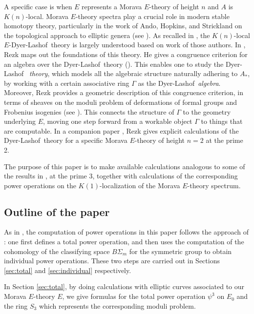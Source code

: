 \documentclass{gtpart}
\theoremstyle{definition}
\theoremstyle{remark}
\newcommand{\DL}{Dyer-Lashof~}
\newcommand{\G}{\Gamma}
\newcommand{\p}{\psi^3}
\begin{document}
A specific case is when $E$ represents a Morava $E$-theory of height $n$ 
and $A$ is $K(n)$-local.  Morava $E$-theory spectra play a crucial role 
in modern stable homotopy theory, particularly in the work of Ando, 
Hopkins, and Strickland on the topological approach to elliptic genera 
(see \cite{cube}).  As recalled in \cite[1.5]{cong}, the $K(n)$-local 
$E$-\DL theory is largely understood based on work of those authors.  In 
\cite{cong}, Rezk maps out the foundations of this theory.  He gives a 
congruence criterion for an algebra over the \DL theory 
(\cite[Theorem A]{cong}).  This enables one to study the \DL 
{\em theory}, which models all the algebraic structure naturally 
adhering to $A_*$, by working with a certain associative ring $\G$ as 
the \DL {\em algebra}.  Moreover, Rezk provides a geometric description 
of this congruence criterion, in terms of sheaves on the moduli problem 
of deformations of formal groups and Frobenius isogenies (see 
\cite[Theorem B]{cong}).  This connects the structure of $\G$ to the 
geometry underlying $E$, moving one step forward from a workable object 
$\G$ to things that are computable.  In a companion paper \cite{h2p2}, 
Rezk gives explicit calculations of the \DL theory for a specific Morava 
$E$-theory of height $n = 2$ at the prime 2.  

The purpose of this paper is to make available calculations analogous to 
some of the results in \cite{h2p2}, at the prime 3, together with 
calculations of the corresponding power operations on the 
$K(1)$-localization of the Morava $E$-theory spectrum.  


\subsection{Outline of the paper}

As in \cite{h2p2}, the computation of power operations in this paper 
follows the approach of \cite{steenrod}: one first defines a total power 
operation, and then uses the computation of the cohomology of the 
classifying space $B\Sigma_m$ for the symmetric group to obtain 
individual power operations.  These two steps are carried out in 
Sections \ref{sec:total} and \ref{sec:individual} respectively.  

In Section \ref{sec:total}, by doing calculations with elliptic curves 
associated to our Morava $E$-theory $E$, we give formulas for the total 
power operation $\p$ on $E_0$ and the ring $S_3$ which represents the 
corresponding moduli problem.  
\end{document}
